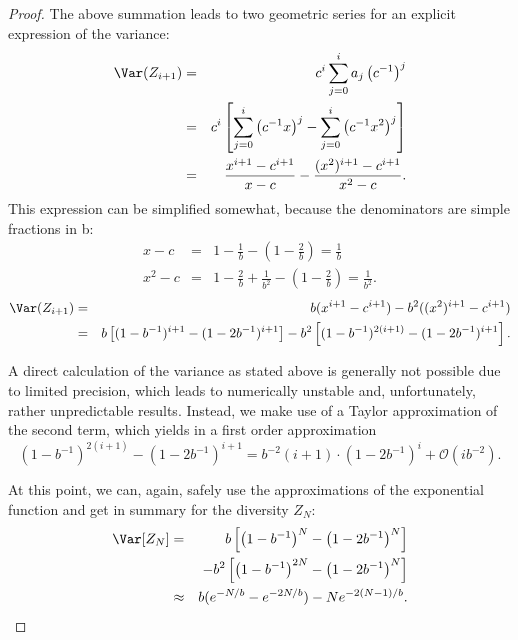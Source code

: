 \begin{proof}
{\noindent
The above summation leads to two geometric series for an explicit expression of the variance:
\begin{eqnarray*}
\Var(Z_{i+1}) &=& c^i \sum_{j=0}^{i} a_{j} \left(c^{-1}\right)^j \\
&=& c^i \left[ \sum_{j=0}^{i}  \left(c^{-1}x \right)^j -  \sum_{j=0}^{i} \left(c^{-1}x^2 \right)^j \right] \\
&=&  \frac{x^{i+1} - c^{i+1}}{x-c} -  \frac{(x^2)^{i+1} - c^{i+1}}{x^2-c}.
\end{eqnarray*}
This expression can be simplified somewhat, because the denominators are simple fractions in b:
\begin{eqnarray*}
x - c &=& 1 - \frac{1}{b} - \left(1 - \frac{2}{b}\right) = \frac{1}{b}\\
x^2-c &=& 1 - \frac{2}{b} + \frac{1}{b^2} - \left(1 - \frac{2}{b}\right) = \frac{1}{b^2}.
\end{eqnarray*}
%
\begin{eqnarray*}
\Var(Z_{i+1}) &=& b (x^{i+1} - c^{i+1}) -  b^2 ((x^2)^{i+1} - c^{i+1})\\
&=& b \left[ (1-b^{-1})^{i+1} -  (1-2b^{-1})^{i+1}\right] - b^2 \left[ (1-b^{-1})^{2(i+1)} -  (1-2b^{-1})^{i+1}\right].
\end{eqnarray*}
%

A direct calculation of the variance as stated above is generally not possible due to limited precision, which leads to numerically unstable and, unfortunately, rather unpredictable results. Instead, we make use of a Taylor approximation of the second term, which yields 
in a first order approximation 
\[
(1-b^{-1})^{2(i+1)} -  (1-2b^{-1})^{i+1} = b^{-2} (i+1) \cdot \left(1 -2b^{-1}\right)^i + \mathcal{O}(ib^{-2}).
\]

At this point, we can, again, safely use the approximations of the exponential function and get in summary for the diversity $Z_N$:
\begin{eqnarray*}
 \Var[Z_N] &=& b \left[ \left(1-b^{-1}\right)^{N} -  \left(1-2b^{-1}\right)^{N}\right]  \\
&& - b^2 \left[ \left(1-b^{-1} \right)^{2N} -  \left(1-2b^{-1}\right)^{N}\right] \\
&\approx& b (e^{-N/b} - e^{-2N/b}) - N e^{-2(N-1)/b}.
\end{eqnarray*}
}
\end{proof}